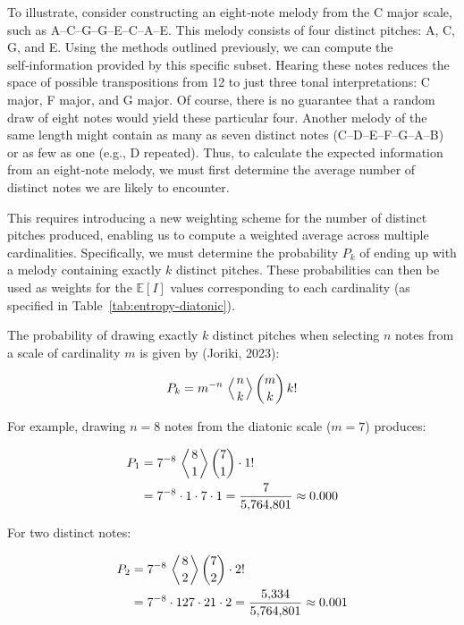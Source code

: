 \documentclass[10pt,twocolumn]{article}
\numberwithin{equation}{section} %
\begin{document}
    To illustrate, consider constructing an eight‑note melody from the C major scale, such as A–C–G–G–E–C–A–E. This melody consists of four distinct pitches: A, C, G, and E.
    Using the methods outlined previously, we can compute the self‑information provided by this specific subset.
    Hearing these notes reduces the space of possible transpositions from 12 to just three tonal interpretations: C major, F major, and G major.
    Of course, there is no guarantee that a random draw of eight notes would yield these particular four.
    Another melody of the same length might contain as many as seven distinct notes (C–D–E–F–G–A–B) or as few as one (e.g., D repeated).
    Thus, to calculate the expected information from an eight‑note melody, we must first determine the average number of distinct notes we are likely to encounter.

    This requires introducing a new weighting scheme for the number of distinct pitches produced, enabling us to compute a weighted average across multiple cardinalities.
    Specifically, we must determine the probability $P_k$ of ending up with a melody containing exactly $k$ distinct pitches.
    These probabilities can then be used as weights for the $\mathbb{E}[I]$ values corresponding to each cardinality (as specified in Table~\ref{tab:entropy-diatonic}).

    The probability of drawing exactly $k$ distinct pitches when selecting $n$ notes from a scale of cardinality $m$ is given by (Joriki, 2023):

    \begin{equation}
        P_k = m^{-n} \, \left\langle \genfrac{}{}{0pt}{}{n}{k} \right\rangle \binom{m}{k} \, k!
        \label{eq:Pk}
    \end{equation}

    For example, drawing $n = 8$ notes from the diatonic scale ($m = 7$) produces:

    \begin{align*}
        P_1 &= 7^{-8} \, \left\langle \genfrac{}{}{0pt}{}{8}{1} \right\rangle \binom{7}{1} \cdot 1! \\
        &= 7^{-8} \cdot 1 \cdot 7 \cdot 1
        = \frac{7}{5{,}764{,}801} \approx 0.000
    \end{align*}

    For two distinct notes:

    \begin{align*}
        P_2 &= 7^{-8} \, \left\langle \genfrac{}{}{0pt}{}{8}{2} \right\rangle \binom{7}{2} \cdot 2! \\
        &= 7^{-8} \cdot 127 \cdot 21 \cdot 2
        = \frac{5{,}334}{5{,}764{,}801} \approx 0.001
    \end{align*}
\end{document}

